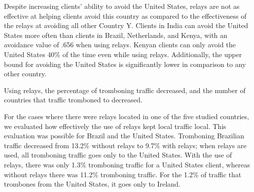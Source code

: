 Despite increasing clients' ability to avoid the United States, relays are not as effective at helping clients avoid this country as compared to the effectiveness of the relays at avoiding all other Country Y.  Clients in India can avoid the United States more often than clients in Brazil, Netherlands, and Kenya, with an avoidance value of .656 when using relays.  Kenyan clients can only avoid the United States 40\% of the time even while using relays.  Additionally, the upper bound for avoiding the United States is significantly lower in comparison to any other country.  

\begin{finding}
Using relays, the percentage of tromboning traffic decreased, and the number of countries that traffic tromboned to decreased.
\end{finding}
For the cases where there were relays located in one of the five studied countries, we evaluated how effectively the use of relays kept local traffic local.  This evaluation was possible for Brazil and the United States.  Tromboning Brazilian traffic decreased from 13.2\% without relays to 9.7\% with relays; when relays are used, all tromboning traffic goes only to the United States.  With the use of relays, there was only 1.3\% tromboning traffic for a United States client, whereas without relays there was 11.2\% tromboning traffic.  For the 1.2\% of traffic that trombones from the United States, it goes only to Ireland.
